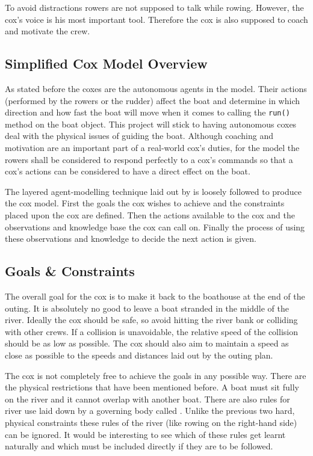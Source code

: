       To avoid distractions rowers are not supposed to talk while rowing. However, the cox's voice is his most important tool. Therefore the cox is also supposed to coach and motivate the crew.
      
      \subsection{Simplified Cox Model Overview}
      As stated before the coxes are the autonomous agents in the model. Their actions (performed by the rowers or the rudder) affect the boat and determine in which direction and how fast the boat will move when it comes to calling the \texttt{run()} method on the boat object. This project will stick to having autonomous coxes deal with the physical issues of guiding the boat. Although coaching and motivation are an important part of a real-world cox's duties, for the model the rowers shall be considered to respond perfectly to a cox's commands so that a cox's actions can be considered to have a direct effect on the boat.
      
      The layered agent-modelling technique laid out by \textcite{Sterling2009} is loosely followed to produce the cox model. First the goals the cox wishes to achieve and the constraints placed upon the cox are defined. Then the actions available to the cox and the observations and knowledge base the cox can call on. Finally the process of using these observations and knowledge to decide the next action is given.

      \subsection{Goals \& Constraints}
      The overall goal for the cox is to make it back to the boathouse at the end of the outing. It is absolutely no good to leave a boat stranded in the middle of the river. Ideally the cox should be safe, so avoid hitting the river bank or colliding with other crews. If a collision is unavoidable, the relative speed of the collision should be as low as possible. The cox should also aim to maintain a speed as close as possible to the speeds and distances laid out by the outing plan.
      
      The cox is not completely free to achieve the goals in any possible way. There are the physical restrictions that have been mentioned before. A boat must sit fully on the river and it cannot overlap with another boat. There are also rules for river use laid down by a governing body called \textcite{CUCBC}. Unlike the previous two hard, physical constraints these rules of the river (like rowing on the right-hand side) can be ignored. It would be interesting to see which of these rules get learnt naturally and which must be included directly if they are to be followed.
      
